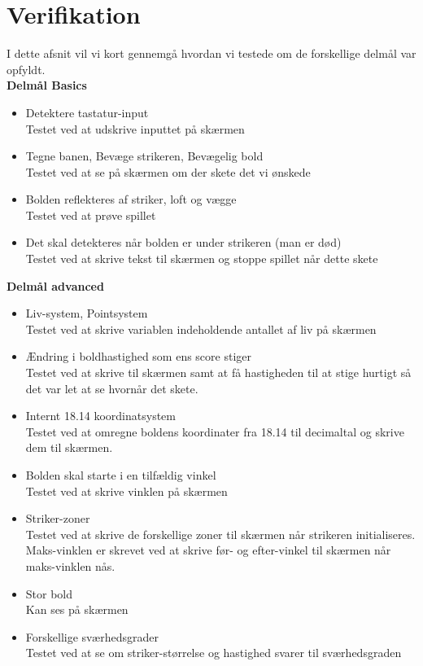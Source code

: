 \chapter{Verifikation}

I dette afsnit vil vi kort gennemgå hvordan vi testede om de forskellige delmål var opfyldt. \\


\textbf{Delmål Basics}
\begin{itemize}
\item Detektere tastatur-input 
\\ Testet ved at udskrive inputtet på skærmen
\item Tegne banen, Bevæge strikeren, Bevægelig bold
\\ Testet ved at se på skærmen om der skete det vi ønskede

\item Bolden reflekteres af striker, loft og vægge
\\ Testet ved at prøve spillet
\item Det skal detekteres når bolden er under strikeren (man er død)
\\ Testet ved at skrive tekst til skærmen og stoppe spillet når dette skete
\end{itemize}

\textbf{Delmål advanced}
\begin{itemize}
\item Liv-system, Pointsystem
\\ Testet ved at skrive variablen indeholdende antallet af liv på skærmen

\item Ændring i boldhastighed som ens score stiger
\\ Testet ved at skrive til skærmen samt at få hastigheden til at stige hurtigt så det var let at se hvornår det skete. 

\item Internt 18.14 koordinatsystem 
\\ Testet ved at omregne boldens koordinater fra 18.14 til decimaltal og skrive dem til skærmen. 
\item Bolden skal starte i en tilfældig vinkel
\\ Testet ved at skrive vinklen på skærmen
\item Striker-zoner
\\ Testet ved at skrive de forskellige zoner til skærmen når strikeren initialiseres. Maks-vinklen er skrevet ved at skrive før- og efter-vinkel til skærmen når maks-vinklen nås. 
\item Stor bold
\\ Kan ses på skærmen
\item Forskellige sværhedsgrader
\\ Testet ved at se om striker-størrelse og hastighed svarer til sværhedsgraden



\end{itemize}	

